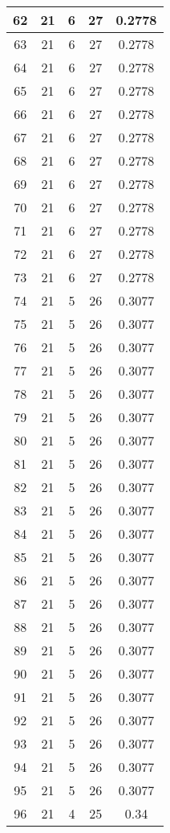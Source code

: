 \documentclass[letterpaper, 12pt]{article}
\begin{document}
\begin{longtable}{|c|c|c|c|c|}
\hline
62 & 21 & 6 & 27 & 0.2778 \\
\hline
63 & 21 & 6 & 27 & 0.2778 \\
\hline
64 & 21 & 6 & 27 & 0.2778 \\
\hline
65 & 21 & 6 & 27 & 0.2778 \\
\hline
66 & 21 & 6 & 27 & 0.2778 \\
\hline
67 & 21 & 6 & 27 & 0.2778 \\
\hline
68 & 21 & 6 & 27 & 0.2778 \\
\hline
69 & 21 & 6 & 27 & 0.2778 \\
\hline
70 & 21 & 6 & 27 & 0.2778 \\
\hline
71 & 21 & 6 & 27 & 0.2778 \\
\hline
72 & 21 & 6 & 27 & 0.2778 \\
\hline
73 & 21 & 6 & 27 & 0.2778 \\
\hline
74 & 21 & 5 & 26 & 0.3077 \\
\hline
75 & 21 & 5 & 26 & 0.3077 \\
\hline
76 & 21 & 5 & 26 & 0.3077 \\
\hline
77 & 21 & 5 & 26 & 0.3077 \\
\hline
78 & 21 & 5 & 26 & 0.3077 \\
\hline
79 & 21 & 5 & 26 & 0.3077 \\
\hline
80 & 21 & 5 & 26 & 0.3077 \\
\hline
81 & 21 & 5 & 26 & 0.3077 \\
\hline
82 & 21 & 5 & 26 & 0.3077 \\
\hline
83 & 21 & 5 & 26 & 0.3077 \\
\hline
84 & 21 & 5 & 26 & 0.3077 \\
\hline
85 & 21 & 5 & 26 & 0.3077 \\
\hline
86 & 21 & 5 & 26 & 0.3077 \\
\hline
87 & 21 & 5 & 26 & 0.3077 \\
\hline
88 & 21 & 5 & 26 & 0.3077 \\
\hline
89 & 21 & 5 & 26 & 0.3077 \\
\hline
90 & 21 & 5 & 26 & 0.3077 \\
\hline
91 & 21 & 5 & 26 & 0.3077 \\
\hline
92 & 21 & 5 & 26 & 0.3077 \\
\hline
93 & 21 & 5 & 26 & 0.3077 \\
\hline
94 & 21 & 5 & 26 & 0.3077 \\
\hline
95 & 21 & 5 & 26 & 0.3077 \\
\hline
96 & 21 & 4 & 25 & 0.34 \\

\end{longtable}
\end{document}

